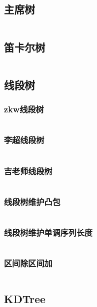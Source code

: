 \documentclass{article}
\begin{document}
\subsection{主席树}
\inputminted[breaklines]{c++}{../数据结构/主席树.cpp}

\subsection{笛卡尔树}
\inputminted[breaklines]{c++}{../数据结构/笛卡尔树.cpp}

\subsection{线段树}
\subsubsection{zkw线段树}
\inputminted[breaklines]{c++}{../数据结构/zkw.cpp}

\subsubsection{李超线段树}
\inputminted[breaklines]{c++}{../数据结构/李超线段树.cpp}

\subsubsection{吉老师线段树}
\inputminted[breaklines]{c++}{../数据结构/吉老师线段树.cpp}

\subsubsection{线段树维护凸包}
\inputminted[breaklines]{c++}{../数据结构/线段树维护凸包.cpp}

\subsubsection{线段树维护单调序列长度}
\inputminted[breaklines]{c++}{../数据结构/线段树维护单调序列长度.cpp}

\subsubsection{区间除区间加}
\inputminted[breaklines]{c++}{../数据结构/区间除区间加.cpp}

\subsection{KDTree}
\end{document}
